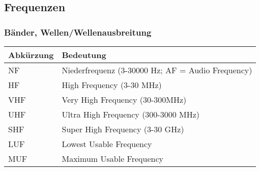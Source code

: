 
\subsection*{Frequenzen}
\begin{frame}
    \frametitle{Bänder, Wellen/Wellenausbreitung}

    \begin{center}
    \footnotesize
    \begin{tabular}{|l|l|}\hline
        \textbf{Abkürzung} & \textbf{Bedeutung}                         \\ \hline \hline
        NF    & Niederfrequenz (3-30000 Hz; AF = Audio Frequency)       \\ \hline
        HF    & High Frequency (3-30 MHz)                               \\ \hline
        VHF   & Very High Frequency (30-300MHz)                         \\ \hline
        UHF   & Ultra High Frequency (300-3000 MHz)                     \\ \hline
        SHF   & Super High Frequency (3-30 GHz)                         \\ \hline
        LUF   & Lowest Usable Frequency                                 \\ \hline
        MUF   & Maximum Usable Frequency                                \\ \hline
    \end{tabular}
    \end{center}

\end{frame}


